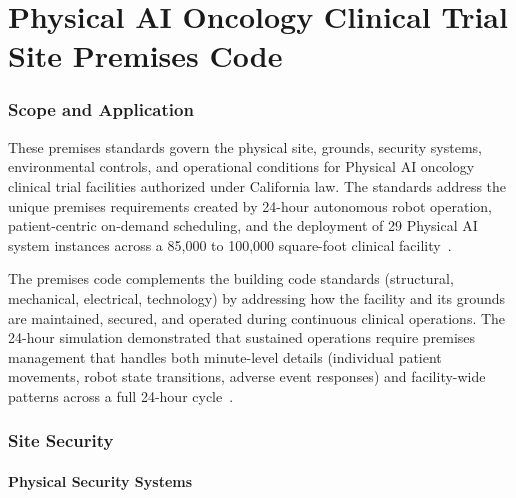 

\part{Physical AI Oncology Clinical Trial Site Premises Code}
\setcounter{section}{0}

\section{Scope and Application}

These premises standards govern the physical site, grounds, security systems,
environmental controls, and operational conditions for Physical AI oncology
clinical trial facilities authorized under California law. The standards address
the unique premises requirements created by 24-hour autonomous robot operation,
patient-centric on-demand scheduling, and the deployment of 29 Physical AI
system instances across a 85,000 to 100,000 square-foot clinical
facility~\cite{sitespec2026}.

The premises code complements the building code standards (structural,
mechanical, electrical, technology) by addressing how the facility and its
grounds are maintained, secured, and operated during continuous clinical
operations. The 24-hour simulation demonstrated that sustained operations
require premises management that handles both minute-level details (individual
patient movements, robot state transitions, adverse event responses) and
facility-wide patterns across a full 24-hour cycle~\cite{newtrial2026}.

\section{Site Security}

\subsection{Physical Security Systems}

